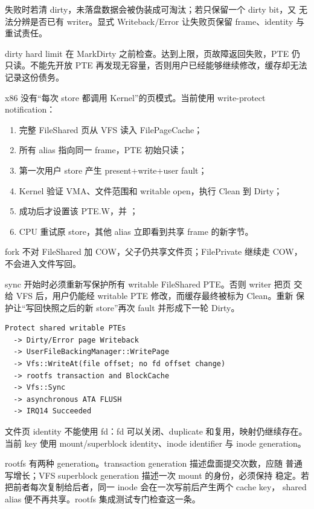 失败时若清 dirty，未落盘数据会被伪装成可淘汰；若只保留一个 dirty bit，又
无法分辨是否已有 writer。显式 Writeback/Error 让失败页保留 frame、identity
与重试责任。

dirty hard limit 在 MarkDirty 之前检查。达到上限，页故障返回失败，PTE 仍
只读。不能先开放 PTE 再发现无容量，否则用户已经能够继续修改，缓存却无法
记录这份债务。

x86 没有“每次 store 都调用 Kernel”的页模式。当前使用 write-protect
notification：

\begin{enumerate}
  \item 完整 FileShared 页从 VFS 读入 FilePageCache；
  \item 所有 alias 指向同一 frame，PTE 初始只读；
  \item 第一次用户 store 产生 present+write+user fault；
  \item Kernel 验证 VMA、文件范围和 writable open，执行 Clean 到 Dirty；
  \item 成功后才设置该 PTE.W，并 ；
  \item CPU 重试原 store，其他 alias 立即看到共享 frame 的新字节。
\end{enumerate}

fork 不对 FileShared 加 COW，父子仍共享文件页；FilePrivate 继续走 COW，
不会进入文件写回。

sync 开始时必须重新写保护所有 writable FileShared PTE。否则 writer 把页
交给 VFS 后，用户仍能经 writable PTE 修改，而缓存最终被标为 Clean。重新
保护让“写回快照之后的新 store”再次 fault 并形成下一轮 Dirty。

\par
\begin{lstlisting}
Protect shared writable PTEs
  -> Dirty/Error page Writeback
  -> UserFileBackingManager::WritePage
  -> Vfs::WriteAt(file offset; no fd offset change)
  -> rootfs transaction and BlockCache
  -> Vfs::Sync
  -> asynchronous ATA FLUSH
  -> IRQ14 Succeeded
\end{lstlisting}

文件页 identity 不能使用 fd：fd 可以关闭、duplicate 和复用，映射仍继续存在。
当前 key 使用 mount/superblock identity、inode identifier 与 inode
generation。

rootfs 有两种 generation。transaction generation 描述盘面提交次数，应随
普通写增长；VFS superblock generation 描述一次 mount 的身份，必须保持
稳定。若把前者每次复制给后者，同一 inode 会在一次写前后产生两个 cache key，
shared alias 便不再共享。rootfs 集成测试专门检查这一条。

